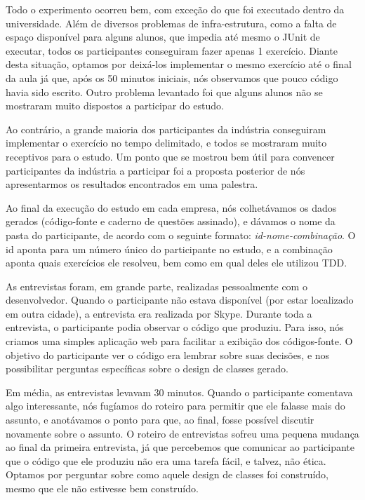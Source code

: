 Todo o experimento ocorreu bem, com exceção do que foi executado
dentro da universidade. Além de diversos problemas de infra-estrutura,
como a falta de espaço disponível para alguns alunos, que impedia até mesmo
o JUnit de executar, todos os participantes conseguiram fazer apenas
1 exercício. Diante desta situação, optamos por deixá-los implementar
o mesmo exercício até o final da aula já que, após os 50 minutos iniciais,
nós observamos que pouco código havia sido escrito. Outro problema levantado
foi que alguns alunos não se mostraram muito dispostos a participar
do estudo.

Ao contrário, a grande maioria dos participantes da indústria conseguiram
implementar o exercício no tempo delimitado, e todos se mostraram
muito receptivos para o estudo. Um ponto que se mostrou bem útil
para convencer participantes da indústria a participar foi a proposta
posterior de nós apresentarmos os resultados encontrados em uma palestra.

Ao final da execução do estudo em cada empresa, nós colhetávamos
os dados gerados (código-fonte e caderno de questões assinado),
e dávamos o nome da pasta do participante, de acordo com
o seguinte formato: \textit{id-nome-combinação}. O id aponta
para um número único do participante no estudo, e a combinação
aponta quais exercícios ele resolveu, bem como em qual deles
ele utilizou TDD.

As entrevistas foram, em grande parte, realizadas pessoalmente com 
o desenvolvedor. Quando o participante não estava disponível (por estar
localizado em outra cidade), a entrevista era realizada por Skype.
Durante toda a entrevista, o participante podia observar o código que
produziu. Para isso, nós criamos uma simples aplicação web para facilitar
a exibição dos códigos-fonte. O objetivo do participante ver o código
era lembrar sobre suas decisões, e nos possibilitar perguntas específicas
sobre o design de classes gerado.

Em média, as entrevistas levavam 30 minutos. Quando o participante comentava
algo interessante, nós fugíamos do roteiro para permitir que ele falasse mais do assunto,
e anotávamos o ponto para que, ao final, fosse possível discutir novamente sobre o assunto.
O roteiro de entrevistas sofreu uma pequena mudança ao final da primeira entrevista,
já que percebemos que comunicar ao participante que o código que ele produziu
 não era uma tarefa fácil, e talvez, não ética. 
Optamos por perguntar sobre como aquele design de classes foi construído, mesmo que ele
não estivesse bem construído.

